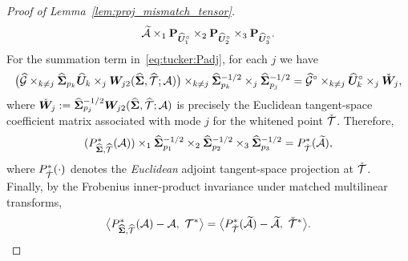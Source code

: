 \documentclass[authoryear,preprint,review,12pt]{elsarticle}
\begin{document}
{\begin{proof}[Proof of Lemma~\ref{lem:proj_mismatch_tensor}]
		\[
		\widetilde{\mathcal{A}}\times_1\mathbf{P}_{\widehat{\boldsymbol U}_1^\circ}\times_2\mathbf{P}_{\widehat{\boldsymbol U}_2^\circ}\times_3\mathbf{P}_{\widehat{\boldsymbol U}_3^\circ}.
		\]
		For the summation term in~\eqref{eq:tucker:Padj}, for each $j$ we have
		\[
		\big(\widehat{\mathcal G}\times_{k\neq j}\widehat{\mathbf{ \Sigma}}_{p_k}\widehat{\boldsymbol U}_k\times_j \boldsymbol W_{j2}(\widehat{\mathbf{ \Sigma}},\widehat{\mathcal{T}};\mathcal{A})\big)
		\times_{k\neq j}\widehat{\mathbf{ \Sigma}}_{p_k}^{-1/2}\times_j\widehat{\mathbf{ \Sigma}}_{p_j}^{-1/2}
		=
		\widehat{\mathcal G}^\circ\times_{k\neq j}\widehat{\boldsymbol U}_k^\circ\times_j \check{\boldsymbol W}_j,
		\]
		where $\check{\boldsymbol W}_j:=\widehat{\mathbf{ \Sigma}}_{p_j}^{-1/2}\boldsymbol W_{j2}(\widehat{\mathbf{ \Sigma}},\widehat{\mathcal{T}};\mathcal{A})$ is precisely the Euclidean
		tangent-space coefficient matrix associated with mode $j$ for the whitened point $\check{\mathcal{T}}$.
		Therefore,
		\begin{equation}\label{eq:whiten_proj}
			(P_{\widehat{\mathbf{ \Sigma}},\widehat{\mathcal{T}}}^\ast(\mathcal{A}))
			\times_1\widehat{\mathbf{ \Sigma}}_{p_1}^{-1/2}\times_2\widehat{\mathbf{ \Sigma}}_{p_2}^{-1/2}\times_3\widehat{\mathbf{ \Sigma}}_{p_3}^{-1/2}
			=
			P_{\check{\mathcal{T}}}^\ast(\widetilde{\mathcal{A}}),
		\end{equation}
		where $P_{\check{\mathcal{T}}}^\ast(\cdot)$ denotes the \emph{Euclidean} adjoint tangent-space projection at $\check{\mathcal{T}}$.
		Finally, by the Frobenius inner-product invariance under matched multilinear transforms,
		\begin{equation}\label{eq:inner_whitened}
			\big\langle P_{\widehat{\bSigma},\widehat{\mT}}^\ast(\mA)-\mA,\ \mT^\ast\big\rangle
			=
			\big\langle P_{\check{\mT}}^\ast(\widetilde{\mA})-\widetilde{\mA},\ \check{\mT}^\ast\big\rangle.
		\end{equation}
		

\end{proof}}
\end{document}
